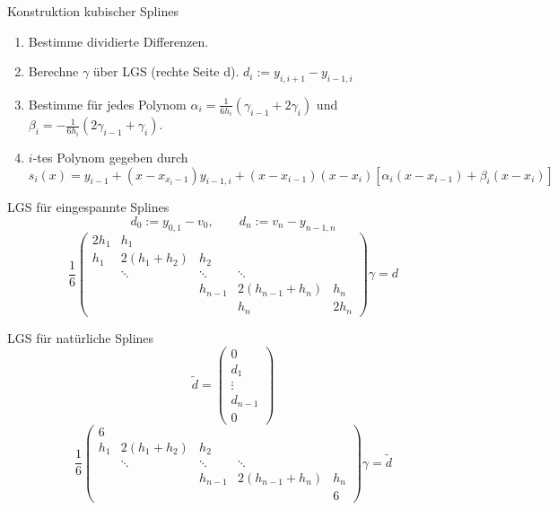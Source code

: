 \begin{flashcard}[Algorithmus]{Konstruktion kubischer Splines}
	\begin{enumerate}
		\item Bestimme dividierte Differenzen.
		\item Berechne $\gamma$ über LGS (rechte Seite d). $d_i := y_{i,i+1} - y_{i-1,i}$
		\item Bestimme für jedes Polynom $\alpha_i = \frac{1}{6 h_i}(\gamma_{i-1} + 2 \gamma_i)$ und $\beta_i = - \frac{1}{6 h_i} (2\gamma_{i-1} + \gamma_i)$.
		\item $i$-tes Polynom gegeben durch $s_i(x) = y_{i-1} + (x - x_{x_i-1}) y_{i-1,i} + (x - x_{i-1})(x - x_i)[\alpha_i(x - x_{i-1}) + \beta_i (x - x_i)]$
	\end{enumerate}
\end{flashcard}

\begin{flashcard}[LGS]{LGS für eingespannte Splines}
	$$d_0 := y_{0,1} - v_0, \qquad d_n := v_n - y_{n-1,n}$$
	$$
		\frac{1}{6}
		\begin{pmatrix}
			2 h_1 & h_1 & & & \\
			h_1 & 2(h_1 + h_2) & h_2 & & \\
			& \ddots & \ddots & \ddots & \\
			& & h_{n-1} & 2(h_{n-1} + h_n) & h_n\\
			& & & h_n & 2 h_n
		\end{pmatrix}
		\gamma = d
	$$
\end{flashcard}

\begin{flashcard}[LGS]{LGS für natürliche Splines}
	$$
		\tilde{d} = \begin{pmatrix}
			0\\
			d_1\\
			\vdots\\
			d_{n-1}\\
			0
		\end{pmatrix}
	$$
	$$
		\frac{1}{6}
		\begin{pmatrix}
			6 & & & & \\
			h_1 & 2(h_1 + h_2) & h_2 & & \\
			& \ddots & \ddots & \ddots & \\
			& & h_{n-1} & 2(h_{n-1} + h_n) & h_n\\
			& & & & 6
		\end{pmatrix}
		\gamma = \tilde{d}
	$$
\end{flashcard}

